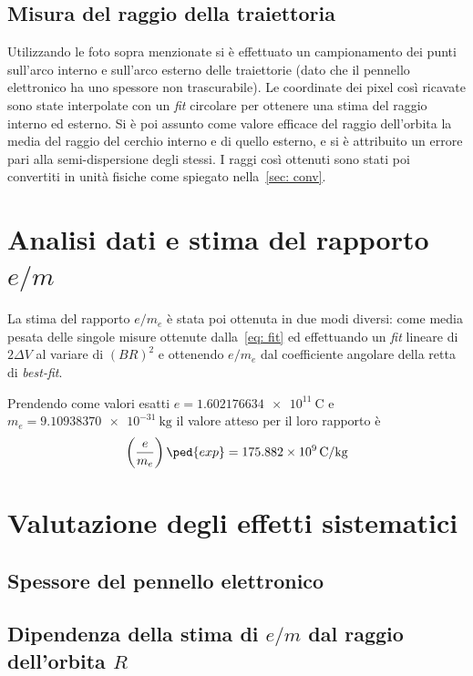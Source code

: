 \documentclass[10pt, a4paper, italian]{article}
\begin{document}
\subsection{Misura del raggio della traiettoria}
Utilizzando le foto sopra menzionate si è effettuato un campionamento dei punti
sull'arco interno e sull'arco esterno delle traiettorie (dato che il pennello elettronico ha uno spessore non trascurabile). Le coordinate dei pixel così ricavate
sono state interpolate con un \emph{fit} circolare per ottenere una stima del
raggio interno ed esterno. Si è poi assunto come valore efficace del raggio
dell'orbita la media del raggio del cerchio interno e di quello esterno,
e si è attribuito un errore pari alla semi-dispersione degli stessi.
I raggi così ottenuti sono stati poi convertiti in unità fisiche come spiegato
nella~\cref{sec: conv}. \\

\section{Analisi dati e stima del rapporto $e/m$}
La stima del rapporto $ e/m_{e} $ è stata poi ottenuta in due modi diversi:
come media pesata delle singole misure ottenute dalla~\eqref{eq: fit} ed
effettuando un \emph{fit} lineare di $ 2\Delta V $ al variare di
$ (B R)^{2} $ e ottenendo $ e/m_{e} $ dal coefficiente angolare della retta
di \emph{best-fit}.

Prendendo come valori esatti $e = \SI{1.602176634e11}{\coulomb}$ e
$m_{e} = \SI{9.10938370e-31}{\kilogram}$ il valore atteso per il loro
rapporto è
\begin{equation}\label{eq: e-m-exp}
\left(\frac{e}{m_{e}}\right)\ped{exp} = \SI{175.882e9}{\coulomb/\kilogram}
\end{equation}

\section{Valutazione degli effetti sistematici}

\subsection{Spessore del pennello elettronico}

\subsection{Dipendenza della stima di $e/m$ dal raggio dell'orbita $R$}
\end{document}
